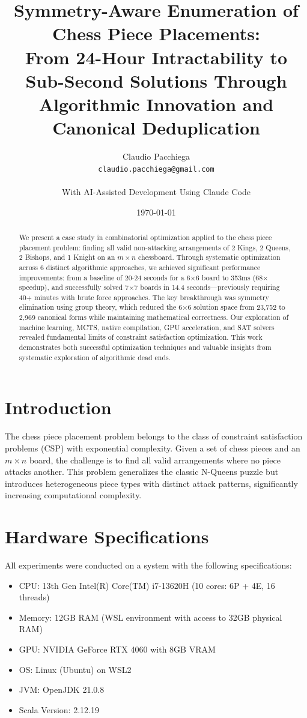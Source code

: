 \documentclass[12pt,a4paper]{article}
\title{Symmetry-Aware Enumeration of Chess Piece Placements:\\
From 24-Hour Intractability to Sub-Second Solutions Through\\
Algorithmic Innovation and Canonical Deduplication}
\author{Claudio Pacchiega\\
\texttt{claudio.pacchiega@gmail.com}\\
\\
\small{With AI-Assisted Development Using Claude Code}}
\date{\today}
\theoremstyle{definition}
\begin{document}
\maketitle

\begin{abstract}
We present a case study in combinatorial optimization applied to the chess piece placement problem: finding all valid non-attacking arrangements of 2 Kings, 2 Queens, 2 Bishops, and 1 Knight on an $m \times n$ chessboard. Through systematic optimization across 6 distinct algorithmic approaches, we achieved significant performance improvements: from a baseline of 20-24 seconds for a 6$\times$6 board to 353ms (68$\times$ speedup), and successfully solved 7$\times$7 boards in 14.4 seconds---previously requiring 40+ minutes with brute force approaches. The key breakthrough was symmetry elimination using group theory, which reduced the 6$\times$6 solution space from 23,752 to 2,969 canonical forms while maintaining mathematical correctness. Our exploration of machine learning, MCTS, native compilation, GPU acceleration, and SAT solvers revealed fundamental limits of constraint satisfaction optimization. This work demonstrates both successful optimization techniques and valuable insights from systematic exploration of algorithmic dead ends.
\end{abstract}

\section{Introduction}

The chess piece placement problem belongs to the class of constraint satisfaction problems (CSP) with exponential complexity. Given a set of chess pieces and an $m \times n$ board, the challenge is to find all valid arrangements where no piece attacks another. This problem generalizes the classic N-Queens puzzle but introduces heterogeneous piece types with distinct attack patterns, significantly increasing computational complexity.

\section{Hardware Specifications}

All experiments were conducted on a system with the following specifications:
\begin{itemize}
    \item CPU: 13th Gen Intel(R) Core(TM) i7-13620H (10 cores: 6P + 4E, 16 threads)
    \item Memory: 12GB RAM (WSL environment with access to 32GB physical RAM)
    \item GPU: NVIDIA GeForce RTX 4060 with 8GB VRAM
    \item OS: Linux (Ubuntu) on WSL2
    \item JVM: OpenJDK 21.0.8
    \item Scala Version: 2.12.19
\end{itemize}
\end{document}
